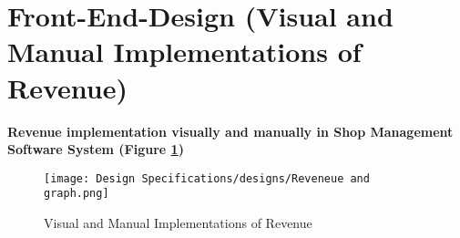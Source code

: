 \section{Front-End-Design (Visual and Manual Implementations of Revenue)}
\vspace{2cm}
\textbf{Revenue implementation visually and manually in Shop Management Software System (Figure \ref{fig:fig 5.13})}\\

\begin{figure}[ht]
    \centering  
    \texttt{[image: Design Specifications/designs/Reveneue and graph.png]}    
    \caption{Visual and Manual Implementations of Revenue}
    \label{fig:fig 5.13}
\end{figure}